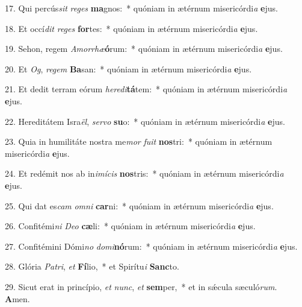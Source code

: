 17. Qui percús\textit{sit} \textit{re}\textit{ges} \textbf{ma}gnos:~*  quóniam in ætérnum misericórdi\textit{a} \textbf{e}jus.\

18. Et occí\textit{dit} \textit{re}\textit{ges} \textbf{for}tes:~*  quóniam in ætérnum misericórdi\textit{a} \textbf{e}jus.\

19. Sehon, regem \textit{A}\textit{mor}\textit{rhæ}\textbf{ó}rum:~*  quóniam in ætérnum misericórdi\textit{a} \textbf{e}jus.\

20. Et \textit{Og}, \textit{re}\textit{gem} \textbf{Ba}san:~*  quóniam in ætérnum misericórdi\textit{a} \textbf{e}jus.\

21. Et dedit terram eórum \textit{he}\textit{re}\textit{di}\textbf{tá}tem:~*  quóniam in ætérnum misericórdi\textit{a} \textbf{e}jus.\

22. Hereditátem Isra\textit{ël}, \textit{ser}\textit{vo} \textbf{su}o:~*  quóniam in ætérnum misericórdi\textit{a} \textbf{e}jus.\

23. Quia in humilitáte nostra me\textit{mor} \textit{fu}\textit{it} \textbf{nos}tri:~*  quóniam in ætérnum misericórdi\textit{a} \textbf{e}jus.\

24. Et redémit nos ab in\textit{i}\textit{mí}\textit{cis} \textbf{nos}tris:~*  quóniam in ætérnum misericórdi\textit{a} \textbf{e}jus.\

25. Qui dat es\textit{cam} \textit{om}\textit{ni} \textbf{car}ni:~*  quóniam in ætérnum misericórdi\textit{a} \textbf{e}jus.\

26. Confitémi\textit{ni} \textit{De}\textit{o} \textbf{cæ}li:~*  quóniam in ætérnum misericórdi\textit{a} \textbf{e}jus.\

27. Confitémini Dómi\textit{no} \textit{do}\textit{mi}\textbf{nó}rum:~*  quóniam in ætérnum misericórdi\textit{a} \textbf{e}jus.\

28. Glória \textit{Pa}\textit{tri}, \textit{et} \textbf{Fí}lio,~*  et Spirítu\textit{i} \textbf{Sanc}to.\

29. Sicut erat in princípio, \textit{et} \textit{nunc}, \textit{et} \textbf{sem}per,~*  et in sǽcula sæculó\textit{rum}. \textbf{A}men.\

